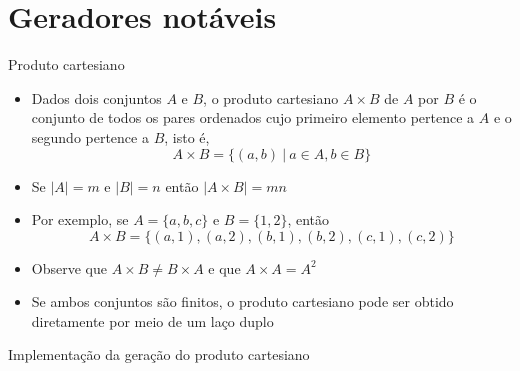 \section{Geradores notáveis}

\begin{frame}[fragile]{Produto cartesiano}

    \begin{itemize}
        \item Dados dois conjuntos $A$ e $B$, o produto cartesiano $A\times B$ de $A$ por
            $B$ é o conjunto de todos os pares ordenados cujo primeiro elemento pertence
            a $A$ e o segundo pertence a $B$, isto é,
        \[
            A\times B = \lbrace (a, b)\ |\ a\in A, b\in B\rbrace
        \]

        \item Se $|A| = m$ e $|B| = n$ então $|A\times B| = mn$

        \item Por exemplo, se $A = \lbrace a, b, c\rbrace$ e $B = \lbrace 1, 2\rbrace$, então
        \[
            A\times B = \lbrace (a, 1), (a, 2), (b, 1), (b, 2), (c, 1), (c, 2)\rbrace
        \]

        \item Observe que $A\times B \neq B\times A$ e que $A\times A = A^2$

        \item Se ambos conjuntos são finitos, o produto cartesiano pode ser obtido diretamente
            por meio de um laço duplo
    \end{itemize}

\end{frame}

\begin{frame}[fragile]{Implementação da geração do produto cartesiano}
\end{frame}

